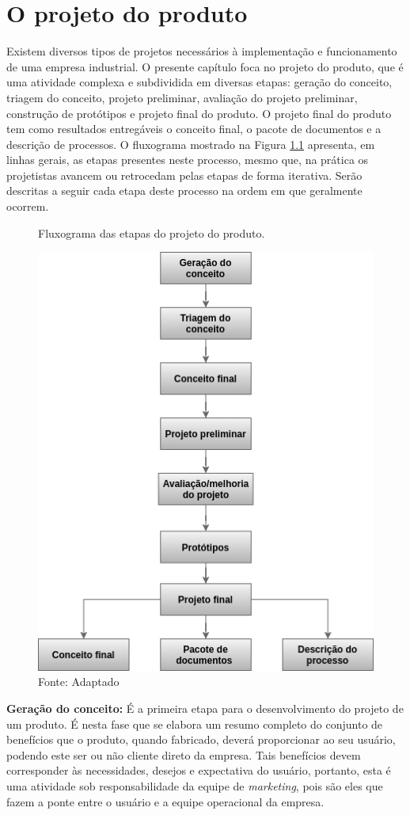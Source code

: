 \chapter{O projeto do produto}
\label{chap:projeto_do_produto}

Existem diversos tipos de projetos necessários à implementação e funcionamento de uma empresa industrial. O presente capítulo foca no projeto do produto, que é uma atividade complexa e subdividida em diversas etapas: geração do conceito, triagem do conceito, projeto preliminar, avaliação do projeto preliminar, construção de protótipos e projeto final do produto.  O projeto final do produto tem como resultados entregáveis o conceito final, o pacote de documentos e a descrição de processos. O fluxograma mostrado na Figura \ref{fig:projeto_produto} apresenta, em linhas gerais, as etapas presentes neste processo, mesmo que, na prática os projetistas avancem ou retrocedam pelas etapas de forma iterativa. Serão descritas a seguir cada etapa deste processo na ordem em que geralmente ocorrem.

\begin{figure}[H]
  \centering
  \caption{Fluxograma das etapas do projeto do produto.}
  \includegraphics[width=.7\textwidth]{images/projeto_produto.png}
  \caption*{Fonte: Adaptado \cite{slack2006administracao} }
  \label{fig:projeto_produto}
\end{figure}

\textbf{Geração do conceito:} É a primeira etapa para o desenvolvimento do projeto de um produto. É nesta fase que se elabora um resumo completo do conjunto de benefícios que o produto, quando fabricado, deverá proporcionar ao seu usuário, podendo este ser ou não cliente direto da empresa. Tais benefícios devem corresponder às necessidades, desejos e expectativa do usuário, portanto, esta é uma atividade sob responsabilidade da equipe de \textit{marketing}, pois são eles que fazem a ponte entre o usuário e a equipe operacional da empresa.

